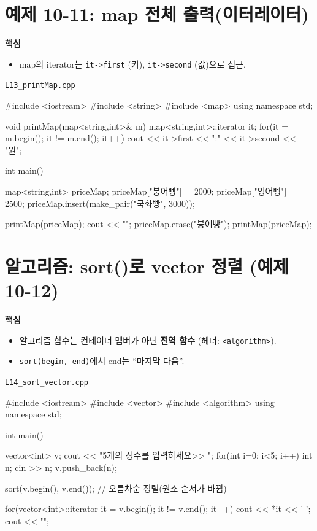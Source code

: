 \documentclass[11pt,a4paper]{article}
\newcommand{\filetag}[1]{\texttt{\color{Accent}#1}}
\begin{document}
\section{예제 10-11: map 전체 출력(이터레이터)}
\begin{GoalBox}
\textbf{핵심}
\begin{itemize}[leftmargin=18pt]
  \item map의 iterator는 \texttt{it->first} (키), \texttt{it->second} (값)으로 접근.
\end{itemize}
\end{GoalBox}

\noindent\filetag{L13\_printMap.cpp}
\begin{cppcode}
#include <iostream>
#include <string>
#include <map>
using namespace std;

void printMap(map<string,int>& m) {
    map<string,int>::iterator it;
    for(it = m.begin(); it != m.end(); it++) {
        cout << it->first << ":" << it->second << "원\n";
    }
}

int main() {
    map<string,int> priceMap;
    priceMap["붕어빵"] = 2000;
    priceMap["잉어빵"] = 2500;
    priceMap.insert(make_pair("국화빵", 3000));

    printMap(priceMap);
    cout << "\n";
    priceMap.erase("붕어빵");
    printMap(priceMap);
}
\end{cppcode}

\section{알고리즘: sort()로 vector 정렬 (예제 10-12)}
\begin{GoalBox}
\textbf{핵심}
\begin{itemize}[leftmargin=18pt]
  \item 알고리즘 함수는 컨테이너 멤버가 아닌 \textbf{전역 함수} (헤더: \texttt{<algorithm>}).
  \item \texttt{sort(begin, end)}에서 end는 ``마지막 다음''.
\end{itemize}
\end{GoalBox}

\noindent\filetag{L14\_sort\_vector.cpp}
\begin{cppcode}
#include <iostream>
#include <vector>
#include <algorithm>
using namespace std;

int main() {
    vector<int> v;
    cout << "5개의 정수를 입력하세요>> ";
    for(int i=0; i<5; i++) {
        int n;
        cin >> n;
        v.push_back(n);
    }

    sort(v.begin(), v.end()); // 오름차순 정렬(원소 순서가 바뀜)

    for(vector<int>::iterator it = v.begin(); it != v.end(); it++)
        cout << *it << ' ';
    cout << "\n";
}
\end{cppcode}
\end{document}
